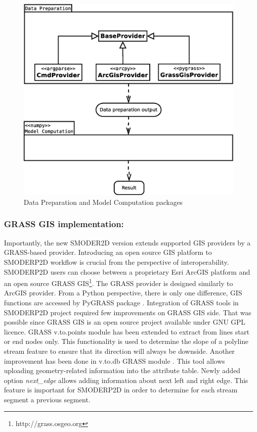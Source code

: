 \begin{figure}[ht!]
  \begin{center}
    \includegraphics[width=1.0\columnwidth]{figures/uml_diagram.eps}
    \caption{Data Preparation and Model Computation packages}
    \label{fig:uml_diagram}
  \end{center}
\end{figure}

\subsubsection{GRASS GIS implementation:}
Importantly, the new SMODER2D version extends supported GIS providers
by a GRASS-based provider. Introducing an open source GIS platform to
SMODERP2D workflow is crucial from the perspective of
interoperability. SMODERP2D users can choose between a proprietary
Esri ArcGIS platform and an open source GRASS
GIS\footnote{http://grass.osgeo.org}. The GRASS provider is designed
similarly to ArcGIS provider. From a Python perspective, there is only
one difference, GIS functions are accessed by PyGRASS package
\cite{ijgi2010201}. Integration of GRASS tools in SMODERP2D project
required few improvements on GRASS GIS side. That was possible since
GRASS GIS is an open source project available under GNU GPL
licence. GRASS v.to.points module \cite{v-to-points-2019} has been
extended to extract from lines start or end nodes only. This
functionality is used to determine the slope of a polyline stream
feature to ensure that its direction will always be downside. Another
improvement has been done in v.to.db GRASS module
\cite{v-to-db-2019}. This tool allows uploading geometry-related
information into the attribute table. Newly added option {\it next\_edge}
allows adding information about next left and right edge. This feature
is important for SMODERP2D in order to determine for each stream
segment a previous segment.

